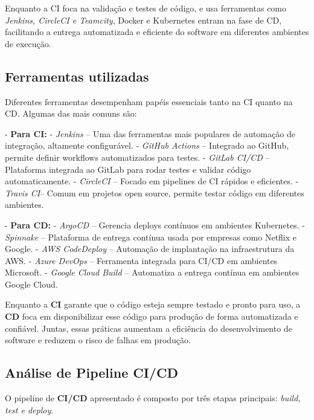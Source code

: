 \documentclass[a4paper,12pt]{article}
\begin{document}
Enquanto a CI foca na validação e testes de código, e usa ferramentas como \textit{Jenkins, CircleCI e Teamcity}, Docker e Kubernetes entram na fase de CD, facilitando a entrega automatizada e eficiente do software em diferentes ambientes de execução.
\subsection*{Ferramentas utilizadas}
Diferentes ferramentas desempenham papéis essenciais tanto na CI quanto na CD. Algumas das mais comuns são:  

- \textbf{Para CI:} \newline{} 
- \textit{Jenkins} – Uma das ferramentas mais populares de automação de integração, altamente configurável.  \newline{}
  -  \textit{GitHub Actions} – Integrado ao GitHub, permite definir workflows automatizados para testes.  \newline{}
  -  \textit{GitLab CI/CD} – Plataforma integrada ao GitLab para rodar testes e validar código automaticamente.  \newline{}
  -  \textit{CircleCI} – Focado em pipelines de CI rápidos e eficientes.  \newline{}
  -  \textit{Travis CI}– Comum em projetos open source, permite testar código em diferentes ambientes.  \newline{}

  - \textbf{Para CD:} \newline
- \textit{ArgoCD} – Gerencia deploys contínuos em ambientes Kubernetes. \newline 
- \textit{Spinnake} – Plataforma de entrega contínua usada por empresas como Netflix e Google. \newline
- \textit{AWS CodeDeploy} – Automação de implantação na infraestrutura da AWS. \newline
- \textit{Azure DevOps} – Ferramenta integrada para CI/CD em ambientes Microsoft. \newline
- \textit{Google Cloud Build} – Automatiza a entrega contínua em ambientes Google Cloud. \newline

Enquanto a \textbf{CI} garante que o código esteja sempre testado e pronto para uso, a \textbf{CD} foca em disponibilizar esse código para produção de forma automatizada e confiável. Juntas, essas práticas aumentam a eficiência do desenvolvimento de software e reduzem o risco de falhas em produção.  

\subsection*{Análise de Pipeline CI/CD}  
O pipeline de \textbf{CI/CD} apresentado é composto por três etapas principais: \textit{build, test e deploy}.  
\end{document}
